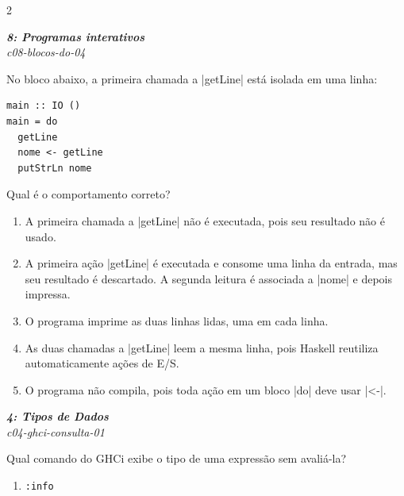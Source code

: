 \documentclass[a4paper,10pt,brazil]{article}
\begin{document}
\begin{multicols}{2}
\begin{flushright}
  \footnotesize
  \textit{\textbf{8: Programas interativos}}\\
  \textit{c08-blocos-do-04}\\

\end{flushright}
No bloco abaixo, a primeira chamada a \haskellinline|getLine| está isolada em uma linha:

\begin{verbatim}
main :: IO ()
main = do
  getLine
  nome <- getLine
  putStrLn nome
\end{verbatim}

Qual é o comportamento correto?

\begin{enumerate}
  \item A primeira chamada a \haskellinline|getLine| não é executada, pois seu resultado não é usado.

  \item A primeira ação \haskellinline|getLine| é executada e consome uma linha da entrada, mas seu resultado é descartado. A segunda leitura é associada a \haskellinline|nome| e depois impressa.

  \item O programa imprime as duas linhas lidas, uma em cada linha.

  \item As duas chamadas a \haskellinline|getLine| leem a mesma linha, pois Haskell reutiliza automaticamente ações de E/S.

  \item O programa não compila, pois toda ação em um bloco \haskellinline|do| deve usar \haskellinline|<-|.


\end{enumerate}

\begin{flushright}
  \footnotesize
  \textit{\textbf{4: Tipos de Dados}}\\
  \textit{c04-ghci-consulta-01}\\

\end{flushright}
Qual comando do GHCi exibe o tipo de uma expressão sem avaliá-la?

\begin{enumerate}
  \item \texttt{:info}


\end{enumerate}
\end{multicols}
\end{document}
